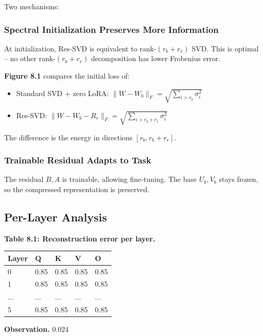 Two mechanisms:

\subsubsection{Spectral Initialization Preserves More Information}

At initialization, Res-SVD is equivalent to rank-$(r_b + r_r)$ SVD. This 
is optimal -- no other rank-$(r_b + r_r)$ decomposition has lower Frobenius 
error.

\textbf{Figure 8.1} compares the initial loss of:
\begin{itemize}
\item Standard SVD + zero LoRA: $\|W - W_b\|_F = \sqrt{\sum_{i > r_b} \sigma_i^2}$
\item Res-SVD: $\|W - W_b - R_r\|_F = \sqrt{\sum_{i > r_b + r_r} \sigma_i^2}$

\end{itemize}
The difference is the energy in directions $[r_b, r_b + r_r]$.

\subsubsection{Trainable Residual Adapts to Task}

The residual $B, A$ is trainable, allowing fine-tuning. The base 
$U_b, V_b$ stays frozen, so the compressed representation is preserved.

\subsection{Per-Layer Analysis}

\textbf{Table 8.1: Reconstruction error per layer.}

\begin{table}[H]
\centering
\small
\begin{tabular}{lllll}
\toprule
\textbf{Layer} & \textbf{Q} & \textbf{K} & \textbf{V} & \textbf{O} \\
\midrule
0 & 0.85 & 0.85 & 0.85 & 0.85 \\
1 & 0.85 & 0.85 & 0.85 & 0.85 \\
... & ... & ... & ... & ... \\
5 & 0.85 & 0.85 & 0.85 & 0.85 \\
\bottomrule
\end{tabular}
\end{table}

\textbf{Observation.} 0.024

